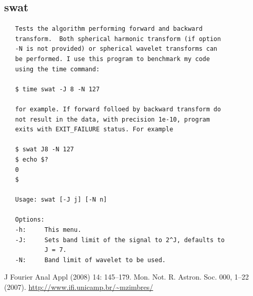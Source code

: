 \documentclass[12pt]{article}
\begin{document}
\subsection{swat}
{\bf \color{textcolor}
   \begin{lstlisting}
   Tests the algorithm performing forward and backward
   transform.  Both spherical harmonic transform (if option
   -N is not provided) or spherical wavelet transforms can
   be performed. I use this program to benchmark my code
   using the time command:
   
   $ time swat -J 8 -N 127
   
   for example. If forward folloed by backward transform do
   not result in the data, with precision 1e-10, program
   exits with EXIT_FAILURE status. For example
   
   $ swat J8 -N 127
   $ echo $?
   0
   $
   
   Usage: swat [-J j] [-N n]

   Options: 
   -h:     This menu.
   -J:     Sets band limit of the signal to 2^J, defaults to
           J = 7.
   -N:     Band limit of wavelet to be used.

   \end{lstlisting}
}

\begin{thebibliography}{99}
 J Fourier Anal Appl (2008) 14: 145–179.
 Mon. Not. R. Astron. Soc. 000, 1–22 (2007). 
 \url{http://www.ifi.unicamp.br/~mzimbres/}
\end{thebibliography}
\end{document}
